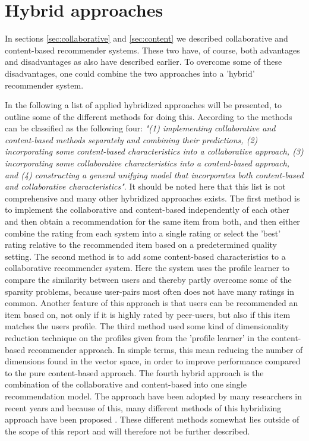 \newpage
\section{Hybrid approaches}
\label{sec:hybrid}
In sections \ref{sec:collaborative} and \ref{sec:content} we described collaborative and content-based recommender systems. These two have, of course, both advantages and disadvantages as also have described earlier. To overcome some of these disadvantages, one could combine the two approaches into a 'hybrid' recommender system.\newline

In the following a list of applied hybridized approaches will be presented, to outline some of the different methods for doing this.
According to \citet[p. 20-22]{TowardsTheNextGenerationOfRs} the methods can be classified as the following four: \textit{"(1) implementing collaborative and content-based methods separately and combining their predictions, (2) incorporating some content-based characteristics into a collaborative approach, (3) incorporating some collaborative characteristics into a content-based approach, and (4) constructing a general unifying model that incorporates both content-based and collaborative characteristics"}. It should be noted here that this list is not comprehensive and many other hybridized approaches exists. \newline
The first method is to implement the collaborative and content-based independently of each other and then obtain a recommendation for the same item from both, and then either combine the rating from each system into a single rating or select the 'best' rating relative to the recommended item based on a predetermined quality setting. \newline
The second method is to add some content-based characteristics to a collaborative recommender system. Here the system uses the profile learner to compare the similarity between users and thereby partly overcome some of the sparsity problems, because user-pairs most often does not have many ratings in common. Another feature of this approach is that users can be recommended an item based on, not only if it is highly rated by peer-users, but also if this item matches the users profile. \newline
The third method used some kind of dimensionality reduction technique on the profiles given from the 'profile learner' in the content-based recommender approach. In simple terms, this mean reducing the number of dimensions found in the vector space, in order to improve performance compared to the pure content-based approach. \newline
The fourth hybrid approach is the combination of the collaborative and content-based into one single recommendation model. The approach have been adopted by many researchers in recent years and because of this, many different methods of this hybridizing approach have been proposed \citep[p. 22]{TowardsTheNextGenerationOfRs}. These different methods somewhat lies outside of the scope of this report and will therefore not be further described. \newline
